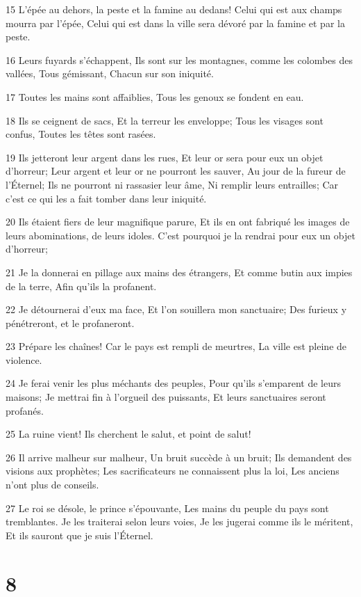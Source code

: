 \par 15 L'épée au dehors, la peste et la famine au dedans! Celui qui est aux champs mourra par l'épée, Celui qui est dans la ville sera dévoré par la famine et par la peste.
\par 16 Leurs fuyards s'échappent, Ils sont sur les montagnes, comme les colombes des vallées, Tous gémissant, Chacun sur son iniquité.
\par 17 Toutes les mains sont affaiblies, Tous les genoux se fondent en eau.
\par 18 Ils se ceignent de sacs, Et la terreur les enveloppe; Tous les visages sont confus, Toutes les têtes sont rasées.
\par 19 Ils jetteront leur argent dans les rues, Et leur or sera pour eux un objet d'horreur; Leur argent et leur or ne pourront les sauver, Au jour de la fureur de l'Éternel; Ils ne pourront ni rassasier leur âme, Ni remplir leurs entrailles; Car c'est ce qui les a fait tomber dans leur iniquité.
\par 20 Ils étaient fiers de leur magnifique parure, Et ils en ont fabriqué les images de leurs abominations, de leurs idoles. C'est pourquoi je la rendrai pour eux un objet d'horreur;
\par 21 Je la donnerai en pillage aux mains des étrangers, Et comme butin aux impies de la terre, Afin qu'ils la profanent.
\par 22 Je détournerai d'eux ma face, Et l'on souillera mon sanctuaire; Des furieux y pénétreront, et le profaneront.
\par 23 Prépare les chaînes! Car le pays est rempli de meurtres, La ville est pleine de violence.
\par 24 Je ferai venir les plus méchants des peuples, Pour qu'ils s'emparent de leurs maisons; Je mettrai fin à l'orgueil des puissants, Et leurs sanctuaires seront profanés.
\par 25 La ruine vient! Ils cherchent le salut, et point de salut!
\par 26 Il arrive malheur sur malheur, Un bruit succède à un bruit; Ils demandent des visions aux prophètes; Les sacrificateurs ne connaissent plus la loi, Les anciens n'ont plus de conseils.
\par 27 Le roi se désole, le prince s'épouvante, Les mains du peuple du pays sont tremblantes. Je les traiterai selon leurs voies, Je les jugerai comme ils le méritent, Et ils sauront que je suis l'Éternel.

\chapter{8}

